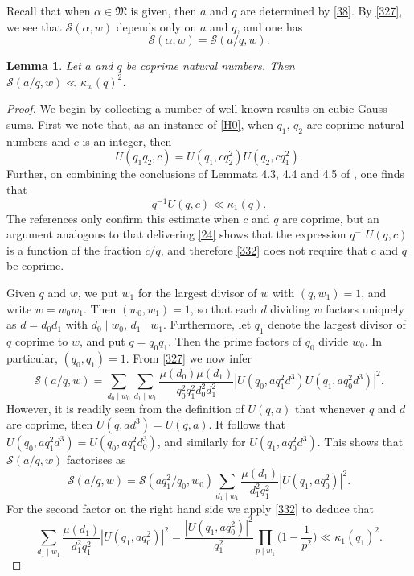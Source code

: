 \documentclass[reqno]{amsart}
\newtheorem{lemma}[thm]{Lemma}
\numberwithin{equation}{section}
\begin{document}
Recall that when $\alpha\in\mathfrak M$ is given, then $a$ and $q$ are determined by \eqref{38}. By \eqref{327}, we see that $\mathscr S(\alpha,w)$ depends only on $a$ and $q$, and one has
$$ \mathscr S(\alpha,w)=\mathscr S(a/q,w). $$

\begin{lemma}\label{L310} Let $a$ and $q$ be coprime natural numbers. Then $\mathscr S(a/q,w)
\ll \kappa_w(q)^2$.
\end{lemma} 

\begin{proof} We begin by collecting a number of well known results on cubic Gauss sums. First we note that, as an instance of \eqref{H0}, when $q_1$, $q_2$ are coprime natural numbers and $c$ is an integer, then
\begin{equation}\label{331} U(q_1q_2,c) = U(q_1,cq_2^2)U(q_2,cq_1^2). \end{equation}
 Further, on combining the conclusions of Lemmata 4.3, 4.4 and 4.5 of \cite{hlm}, one finds that
\begin{equation}\label{332}  q^{-1}U(q,c) \ll \kappa_1(q). \end{equation}
The references only confirm this estimate when $c$ and $q$ are coprime, but an argument analogous to that delivering \eqref{24} shows that the expression $q^{-1}U(q,c)$ is a function of the fraction $c/q$, and therefore \eqref{332} does not require that $c$ and $q$ be coprime.


Given $q$ and $w$, we put {$w_1$ for the largest divisor of $w$ with $(q,w_1)=1$, and write} $w=w_0 w_1$. Then $(w_0,w_1)=1$, so that each $d$ dividing $w$ factors uniquely as $d=d_0 d_1$ with $d_0\mid w_0$, $d_1\mid w_1$. Furthermore, let $q_1$ denote the largest divisor of $q$ coprime to $w$, and put $q=q_0q_1$. Then the prime factors of $q_0$ divide $w_0$. In particular, $(q_0,q_1)=1$. From \eqref{327} we now infer  
$$ \mathscr S(a/q,w) = \sum_{d_0\mid w_0}\sum_{d_1\mid w_1}
\frac{\mu(d_0)\mu(d_1)}{q_0^2q_1^2 d_0^2 d_1^2} |U(q_0, aq_1^2d^3) U(q_1,aq_0^2d^3)|^2. $$
However, it is readily seen from the definition of $U(q,a)$ that whenever $q$ and $d$ are coprime, then $U(q,ad^3)=U(q,a)$. It follows that $U(q_0, aq_1^2d^3)=U(q_0, aq_1^2d_0^3)$, and similarly for $U(q_1,aq_0^2d^3)$. This shows that $\mathscr S(a/q,w)$ factorises as
\begin{equation}\label{333} \mathscr S(a/q,w) = \mathscr S(aq_1^2/q_0,w_0) \sum_{d_1\mid w_1}\frac{\mu(d_1)}{d_1^2q_1^2} |U(q_1,aq_0^2)|^2. \end{equation}
For the second factor on the right hand side we apply \eqref{332} to deduce that
\begin{equation}\label{334} \sum_{d_1\mid w_1}\frac{\mu(d_1)}{d_1^2q_1^2} |U(q_1,aq_0^2)|^2
= \frac{|U(q_1,aq_0^2)|^2}{q_1^2} \prod_{p\mid w_1} \Big(1-\frac1{p^2}\Big) \ll \kappa_1(q_1)^2. \end{equation}


\end{proof}
\end{document}
